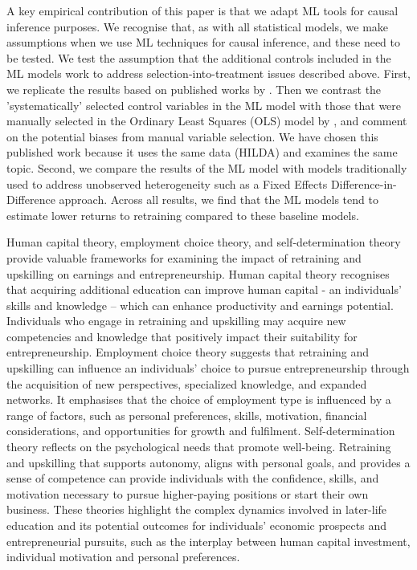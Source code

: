 \documentclass[12pt, a4paper]{article}
\begin{document}
A key empirical contribution of this paper is that we adapt ML tools for causal inference purposes. We recognise that, as with all statistical models, we make assumptions when we use ML techniques for causal inference, and these need to be tested. We test the assumption that the additional controls included in the ML models work to address selection-into-treatment issues described above. First, we replicate the results based on published works by \cite{chesters2015}. Then we contrast the 'systematically' selected control variables in the ML model with those that were manually selected in the Ordinary Least Squares (OLS) model by \cite{chesters2015}, and comment on the potential biases from manual variable selection. We have chosen this published work because it uses the same data (HILDA) and examines the same topic. Second, we compare the results of the ML model with models traditionally used to address unobserved heterogeneity such as a Fixed Effects Difference-in-Difference approach. Across all results, we find that the ML models tend to estimate lower returns to retraining compared to these baseline models.

Human capital theory, employment choice theory, and self-determination theory provide valuable frameworks for examining the impact of retraining and upskilling on earnings and entrepreneurship. Human capital theory \citep{becker1964} recognises that acquiring additional education can improve human capital - an individuals' skills and knowledge – which can enhance productivity and earnings potential. Individuals who engage in retraining and upskilling may acquire new competencies and knowledge that positively impact their suitability for entrepreneurship. Employment choice theory \citep{heckman1993} suggests that retraining and upskilling can influence an individuals' choice to pursue entrepreneurship through the acquisition of new perspectives, specialized knowledge, and expanded networks. It emphasises that the choice of employment type is influenced by a range of factors, such as personal preferences, skills, motivation, financial considerations, and opportunities for growth and fulfilment. Self-determination theory \citep{deci1985} reflects on the psychological needs that promote well-being. Retraining and upskilling that supports autonomy, aligns with personal goals, and provides a sense of competence can provide individuals with the confidence, skills, and motivation necessary to pursue higher-paying positions or start their own business. These theories highlight the complex dynamics involved in later-life education and its potential outcomes for individuals' economic prospects and entrepreneurial pursuits, such as the interplay between human capital investment, individual motivation and personal preferences. 
\end{document}
